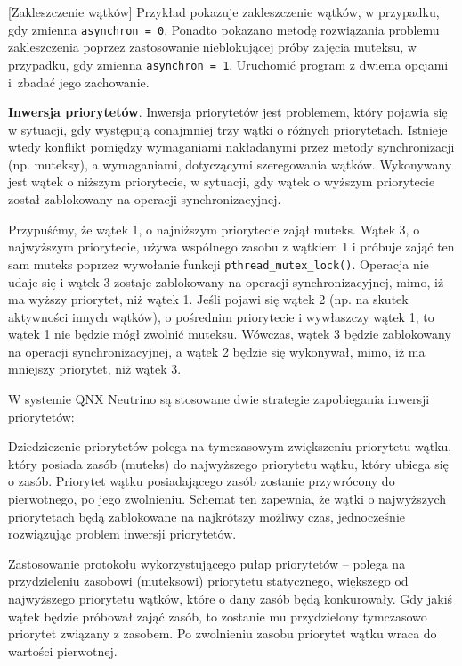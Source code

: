 \begin{example}{[Zakleszczenie wątków]}
Przykład pokazuje zakleszczenie wątków, w przypadku, gdy zmienna \lstinline[style=MyCStyle]{asynchron = 0}. Ponadto pokazano metodę rozwiązania problemu zakleszczenia poprzez zastosowanie nieblokującej próby zajęcia muteksu, w przypadku, gdy zmienna  \lstinline[style=MyCStyle]{asynchron = 1}. Uruchomić program z dwiema opcjami i~zbadać jego zachowanie. 


\end{example}

\textbf{Inwersja priorytetów}. Inwersja priorytetów jest problemem, który pojawia się w sytuacji, gdy występują conajmniej trzy wątki o różnych priorytetach. Istnieje wtedy konflikt pomiędzy wymaganiami nakładanymi przez metody synchronizacji (np. muteksy), a wymaganiami, dotyczącymi szeregowania wątków. Wykonywany jest wątek o niższym priorytecie, w sytuacji, gdy wątek o wyższym priorytecie został zablokowany na operacji synchronizacyjnej. 

Przypuśćmy, że wątek 1, o najniższym priorytecie zajął muteks. Wątek 3, o najwyższym priorytecie, używa wspólnego zasobu z wątkiem 1 i próbuje zająć ten sam muteks poprzez wywołanie funkcji \lstinline[style=MyCStyle]{pthread_mutex_lock()}. Operacja nie udaje się i wątek 3 zostaje zablokowany na operacji synchronizacyjnej, mimo, iż ma wyższy priorytet, niż wątek 1. Jeśli pojawi się wątek 2 (np. na skutek aktywności innych wątków), o pośrednim priorytecie i wywłaszczy wątek 1, to wątek 1 nie będzie mógł zwolnić muteksu. Wówczas, wątek 3 będzie zablokowany na operacji synchronizacyjnej, a wątek 2 będzie się wykonywał, mimo, iż ma mniejszy priorytet, niż wątek 3. 

W systemie QNX Neutrino są stosowane dwie strategie zapobiegania inwersji priorytetów: 
\begin{myenumerate}
\item Dziedziczenie priorytetów polega na tymczasowym zwiększeniu priorytetu wątku, który posiada zasób (muteks) do najwyższego priorytetu wątku, który ubiega się o zasób. Priorytet wątku posiadającego zasób zostanie przywrócony do pierwotnego, po jego zwolnieniu. Schemat ten zapewnia, że wątki o najwyższych priorytetach będą zablokowane na najkrótszy możliwy czas, jednocześnie rozwiązując problem inwersji priorytetów. 
\item Zastosowanie protokołu wykorzystującego pułap priorytetów -- polega na przydzieleniu zasobowi (muteksowi) priorytetu statycznego, większego od najwyższego priorytetu wątków, które o dany zasób będą konkurowały. Gdy jakiś wątek będzie próbował zająć zasób, to zostanie mu przydzielony tymczasowo priorytet związany z zasobem. Po zwolnieniu zasobu priorytet wątku wraca do wartości pierwotnej. 
\end{myenumerate}

